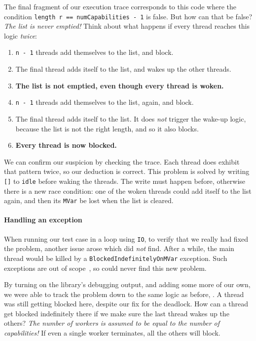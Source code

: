 The final fragment of our execution trace corresponds to this code
where the condition \verb|length r == numCapabilities - 1| is false.
But how can that be false?  \emph{The list is never emptied!}  Think
about what happens if every thread reaches this logic \emph{twice}:

\begin{enumerate}
\item \verb|n - 1| threads add themselves to the list, and block.
\item The final thread adds itself to the list, and wakes up the other
  threads.
\item \textbf{The list is not emptied, even though every thread is woken.}
\item \verb|n - 1| threads add themselves to the list, again, and
  block.
\item The final thread adds itself to the list.  It does \emph{not}
  trigger the wake-up logic, because the list is not the right length,
  and so it also blocks.
\item \textbf{Every thread is now blocked.}
\end{enumerate}

We can confirm our suspicion by checking the trace.  Each thread does
exhibit that pattern twice, so our deduction is correct.  This problem
is solved by writing \verb|[]| to \verb|idle| before waking the
threads.  The write must happen before, otherwise there is a new race
condition: one of the woken threads could add itself to the list
again, and then its \verb|MVar| be lost when the list is cleared.

\paragraph{Handling an exception}
When running our test case in a loop using \verb|IO|, to verify that
we really had fixed the problem, another issue arose which \dejafu{}
did \emph{not} find.  After a while, the main thread would be killed
by a \verb|BlockedIndefinitelyOnMVar| exception.  Such exceptions are
out of scope~, so \dejafu{} could never find this
new problem.

By turning on the library's debugging output, and adding some more of
our own, we were able to track the problem down to the same logic as
before, .  A thread was still getting
blocked here, despite our fix for the deadlock.  How can a thread get
blocked indefinitely there if we make sure the last thread wakes up
the others?  \emph{The number of workers is assumed to be equal to the
  number of capabilities!}  If even a single worker terminates, all
the others will block.


